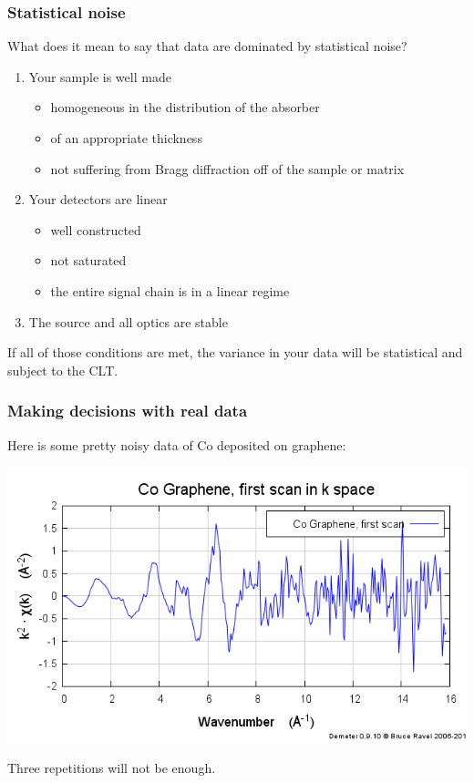 \documentclass[10pt, xcolor=x11names, compress]{beamer}
\begin{document}
\begin{frame}
  \frametitle{Statistical noise}
  What does it mean to say that data are dominated by statistical
  noise?
  \begin{enumerate}
  \item Your sample is well made
    \begin{itemize}
    \item homogeneous in the distribution of the absorber
    \item of an appropriate thickness
    \item not suffering from Bragg diffraction off of the sample or matrix
    \end{itemize}
  \item Your detectors are linear
    \begin{itemize}
    \item well constructed
    \item not saturated
    \item the entire signal chain is in a linear regime
    \end{itemize}
  \item The source and all optics are stable
  \end{enumerate}
  \begin{alertblock}{}
    If all of those conditions are met, the variance in your data will
    be statistical and subject to the CLT.
  \end{alertblock}
\end{frame}

\begin{frame}
  \frametitle{Making decisions with real data}
  \begin{center}
    Here is some pretty noisy data of Co deposited on graphene:

    \bigskip

    \includegraphics[width=0.7\linewidth]{images/firstscan.png}

    \bigskip

    Three repetitions will not be enough.
  \end{center}
\end{frame}
\end{document}
